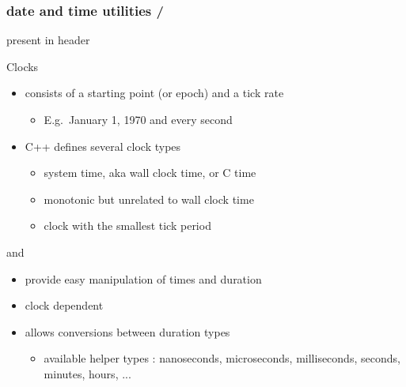 \begin{frame}[fragile]
  \frametitle{\cpp date and time utilities \hfill {} / }
   present in  header
  \begin{block}{Clocks}
    \begin{itemize}
    \item consists of a starting point (or epoch) and a tick rate
      \begin{itemize}
      \item E.g.\ January 1, 1970 and every second
      \end{itemize}
    \item C++ defines several clock types
      \begin{itemize}
      \item \href{https://en.cppreference.com/w/cpp/chrono/system_clock}{\color{blue!50!white} } system time, aka wall clock time, or C time
      \item \href{https://en.cppreference.com/w/cpp/chrono/steady_clock}{\color{blue!50!white} } monotonic but unrelated to wall clock time
      \item \href{https://en.cppreference.com/w/cpp/chrono/high_resolution_clock}{\color{blue!50!white} } clock with the smallest tick period
      \end{itemize}
    \end{itemize}
  \end{block}
  \begin{block}{\href{https://en.cppreference.com/w/cpp/chrono/time_point}{\color{blue!50!white} } and \href{https://en.cppreference.com/w/cpp/chrono/duration}{\color{blue!50!white} }}
    \begin{itemize}
    \item provide easy manipulation of times and duration
    \item clock dependent
    \item \href{https://en.cppreference.com/w/cpp/chrono/duration/duration_cast}{\color{blue!50!white} } allows conversions between duration types
      \begin{itemize}
      \item available helper types : nanoseconds, microseconds, milliseconds, seconds, minutes, hours, ...
      \end{itemize}
    \end{itemize}
  \end{block}
\end{frame}

